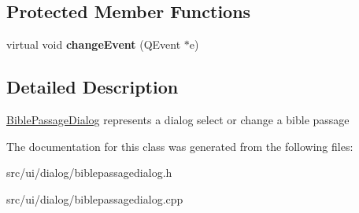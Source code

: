 \subsection*{Protected Member Functions}
\begin{DoxyCompactItemize}
\item 
\hypertarget{classBiblePassageDialog_ad25b0198694bcb2de3fdf963770724aa}{
virtual void {\bfseries changeEvent} (QEvent $\ast$e)}
\label{classBiblePassageDialog_ad25b0198694bcb2de3fdf963770724aa}

\end{DoxyCompactItemize}


\subsection{Detailed Description}
\hyperlink{classBiblePassageDialog}{BiblePassageDialog} represents a dialog select or change a bible passage 

The documentation for this class was generated from the following files:\begin{DoxyCompactItemize}
\item 
src/ui/dialog/biblepassagedialog.h\item 
src/ui/dialog/biblepassagedialog.cpp\end{DoxyCompactItemize}
